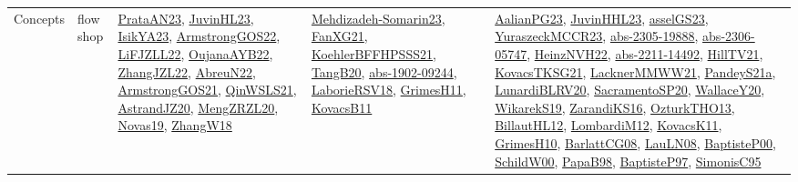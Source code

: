 {\begin{longtable}{llp{6cm}p{6cm}p{6cm}}
Concepts & flow shop & \href{articles/PrataAN23.pdf}{PrataAN23}\cite{PrataAN23}, \href{papers/JuvinHL23.pdf}{JuvinHL23}\cite{JuvinHL23}, \href{articles/IsikYA23.pdf}{IsikYA23}\cite{IsikYA23}, \href{papers/ArmstrongGOS22.pdf}{ArmstrongGOS22}\cite{ArmstrongGOS22}, \href{papers/LiFJZLL22.pdf}{LiFJZLL22}\cite{LiFJZLL22}, \href{papers/OujanaAYB22.pdf}{OujanaAYB22}\cite{OujanaAYB22}, \href{papers/ZhangJZL22.pdf}{ZhangJZL22}\cite{ZhangJZL22}, \href{articles/AbreuN22.pdf}{AbreuN22}\cite{AbreuN22}, \href{papers/ArmstrongGOS21.pdf}{ArmstrongGOS21}\cite{ArmstrongGOS21}, \href{articles/QinWSLS21.pdf}{QinWSLS21}\cite{QinWSLS21}, \href{articles/AstrandJZ20.pdf}{AstrandJZ20}\cite{AstrandJZ20}, \href{articles/MengZRZL20.pdf}{MengZRZL20}\cite{MengZRZL20}, \href{articles/Novas19.pdf}{Novas19}\cite{Novas19}, \href{articles/ZhangW18.pdf}{ZhangW18}\cite{ZhangW18} & \href{papers/Mehdizadeh-Somarin23.pdf}{Mehdizadeh-Somarin23}\cite{Mehdizadeh-Somarin23}, \href{articles/FanXG21.pdf}{FanXG21}\cite{FanXG21}, \href{articles/KoehlerBFFHPSSS21.pdf}{KoehlerBFFHPSSS21}\cite{KoehlerBFFHPSSS21}, \href{papers/TangB20.pdf}{TangB20}\cite{TangB20}, \href{articles/abs-1902-09244.pdf}{abs-1902-09244}\cite{abs-1902-09244}, \href{articles/LaborieRSV18.pdf}{LaborieRSV18}\cite{LaborieRSV18}, \href{papers/GrimesH11.pdf}{GrimesH11}\cite{GrimesH11}, \href{articles/KovacsB11.pdf}{KovacsB11}\cite{KovacsB11} & \href{papers/AalianPG23.pdf}{AalianPG23}\cite{AalianPG23}, \href{papers/JuvinHHL23.pdf}{JuvinHHL23}\cite{JuvinHHL23}, \href{papers/asselGS23.pdf}{asselGS23}\cite{asselGS23}, \href{articles/YuraszeckMCCR23.pdf}{YuraszeckMCCR23}\cite{YuraszeckMCCR23}, \href{articles/abs-2305-19888.pdf}{abs-2305-19888}\cite{abs-2305-19888}, \href{articles/abs-2306-05747.pdf}{abs-2306-05747}\cite{abs-2306-05747}, \href{articles/HeinzNVH22.pdf}{HeinzNVH22}\cite{HeinzNVH22}, \href{articles/abs-2211-14492.pdf}{abs-2211-14492}\cite{abs-2211-14492}, \href{papers/HillTV21.pdf}{HillTV21}\cite{HillTV21}, \href{papers/KovacsTKSG21.pdf}{KovacsTKSG21}\cite{KovacsTKSG21}, \href{papers/LacknerMMWW21.pdf}{LacknerMMWW21}\cite{LacknerMMWW21}, \href{articles/PandeyS21a.pdf}{PandeyS21a}\cite{PandeyS21a}, \href{articles/LunardiBLRV20.pdf}{LunardiBLRV20}\cite{LunardiBLRV20}, \href{articles/SacramentoSP20.pdf}{SacramentoSP20}\cite{SacramentoSP20}, \href{articles/WallaceY20.pdf}{WallaceY20}\cite{WallaceY20}, \href{articles/WikarekS19.pdf}{WikarekS19}\cite{WikarekS19}, \href{articles/ZarandiKS16.pdf}{ZarandiKS16}\cite{ZarandiKS16}, \href{articles/OzturkTHO13.pdf}{OzturkTHO13}\cite{OzturkTHO13}, \href{papers/BillautHL12.pdf}{BillautHL12}\cite{BillautHL12}, \href{articles/LombardiM12.pdf}{LombardiM12}\cite{LombardiM12}, \href{articles/KovacsK11.pdf}{KovacsK11}\cite{KovacsK11}, \href{papers/GrimesH10.pdf}{GrimesH10}\cite{GrimesH10}, \href{papers/BarlattCG08.pdf}{BarlattCG08}\cite{BarlattCG08}, \href{papers/LauLN08.pdf}{LauLN08}\cite{LauLN08}, \href{articles/BaptisteP00.pdf}{BaptisteP00}\cite{BaptisteP00}, \href{articles/SchildW00.pdf}{SchildW00}\cite{SchildW00}, \href{articles/PapaB98.pdf}{PapaB98}\cite{PapaB98}, \href{papers/BaptisteP97.pdf}{BaptisteP97}\cite{BaptisteP97}, \href{papers/SimonisC95.pdf}{SimonisC95}\cite{SimonisC95}\\

\end{longtable}}
